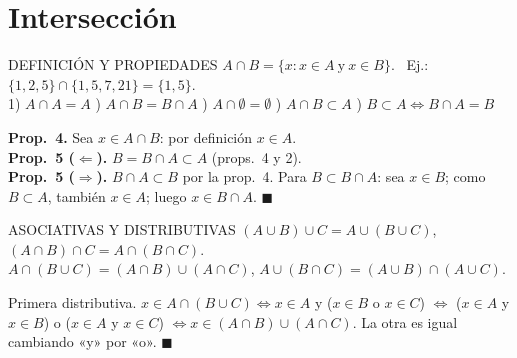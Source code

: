 \section{Intersección}
\apuntes
\begin{sello}{DEFINICIÓN Y PROPIEDADES}
$A\cap B=\{x: x\in A\ \text{y}\ x\in B\}$. \ Ej.: $\{1,2,5\}\cap\{1,5,7,21\}=\{1,5\}$.\\[3pt]
1) $A\cap A=A$ ) $A\cap B=B\cap A$ ) $A\cap\emptyset=\emptyset$ ) $A\cap B\subset A$ ) $B\subset A\iff B\cap A=B$
\end{sello}
\begin{demo}
\textbf{Prop.\ 4.} Sea $x\in A\cap B$: por definición $x\in A$.\\[3pt]
\textbf{Prop.\ 5 ($\Leftarrow$).} $B=B\cap A\subset A$ (props.\ 4 y 2).\\[3pt]
\textbf{Prop.\ 5 ($\Rightarrow$).} $B\cap A\subset B$ por la prop.\ 4. Para $B\subset B\cap A$: sea $x\in B$; como $B\subset A$, también $x\in A$; luego $x\in B\cap A$. $\blacksquare$
\end{demo}

\agregado
\begin{sello}{ASOCIATIVAS Y DISTRIBUTIVAS}
$(A\cup B)\cup C=A\cup(B\cup C)$, \quad $(A\cap B)\cap C=A\cap(B\cap C)$.\\[3pt]
$A\cap(B\cup C)=(A\cap B)\cup(A\cap C)$, \quad $A\cup(B\cap C)=(A\cup B)\cap(A\cup C)$.
\end{sello}
\begin{demo}
Primera distributiva. $x\in A\cap(B\cup C)\iff x\in A$ y ($x\in B$ o $x\in C$) $\iff$ ($x\in A$ y $x\in B$) o ($x\in A$ y $x\in C$) $\iff x\in(A\cap B)\cup(A\cap C)$. La otra es igual cambiando «y» por «o». $\blacksquare$
\end{demo}

